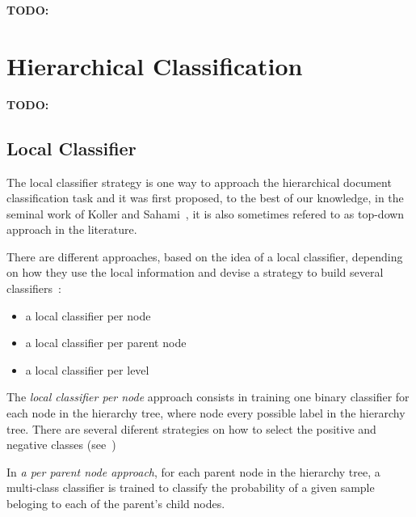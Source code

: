 \documentclass[11pt]{article}
\begin{document}


\textbf{TODO:}


\section{Hierarchical Classification}

\textbf{TODO:}

\subsection{Local Classifier}

The local classifier strategy is one way to approach the hierarchical document classification task
and it was first proposed, to the best of our knowledge, in the seminal work of Koller and
Sahami~, it is also sometimes refered to as top-down
approach in the literature.

There are different approaches, based on the idea of a local classifier, depending on how they use
the local information and devise a strategy to build several classifiers~\cite{Silla:2011:SHC:1937796.1937884}:

\begin{itemize}
\item{a local classifier per node}
\item{a local classifier per parent node}
\item{a local classifier per level}
\end{itemize}


The \textit{local classifier per node} approach consists in training one binary classifier for each
node in the hierarchy tree, where node every possible label in the hierarchy tree. There are several
diferent strategies on how to select the positive and negative classes (see~\cite{})


In \textit{a per parent node approach}, for each parent node in the hierarchy tree, a multi-class
classifier is trained to classify the probability of a given sample beloging to each of the parent's
child nodes.

\end{document}
